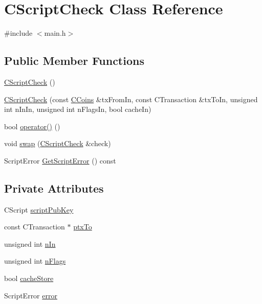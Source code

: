 \hypertarget{class_c_script_check}{}\section{C\+Script\+Check Class Reference}
\label{class_c_script_check}


{\ttfamily \#include $<$main.\+h$>$}

\subsection*{Public Member Functions}
\begin{DoxyCompactItemize}
\item 
\mbox{\hyperlink{class_c_script_check_a4a3bf9c971437bcb6fae3e3254a8c178}{C\+Script\+Check}} ()
\item 
\mbox{\hyperlink{class_c_script_check_a2617b99b66cd1de327478b74d8441c76}{C\+Script\+Check}} (const \mbox{\hyperlink{class_c_coins}{C\+Coins}} \&tx\+From\+In, const C\+Transaction \&tx\+To\+In, unsigned int n\+In\+In, unsigned int n\+Flags\+In, bool cache\+In)
\item 
bool \mbox{\hyperlink{class_c_script_check_a108d4c713338308be3867ed4e65b80c5}{operator()}} ()
\item 
void \mbox{\hyperlink{class_c_script_check_a69fbde608ff29c1885b8b9caf0fd40a0}{swap}} (\mbox{\hyperlink{class_c_script_check}{C\+Script\+Check}} \&check)
\item 
Script\+Error \mbox{\hyperlink{class_c_script_check_a1340496c37e521c253606b5957173afd}{Get\+Script\+Error}} () const
\end{DoxyCompactItemize}
\subsection*{Private Attributes}
\begin{DoxyCompactItemize}
\item 
C\+Script \mbox{\hyperlink{class_c_script_check_a1042feefe3b4706d236edea898e40954}{script\+Pub\+Key}}
\item 
const C\+Transaction $\ast$ \mbox{\hyperlink{class_c_script_check_ac22505a5889791918c2271fd2692e32a}{ptx\+To}}
\item 
unsigned int \mbox{\hyperlink{class_c_script_check_ad7ff03fbbba182a994685ea8c3a2287f}{n\+In}}
\item 
unsigned int \mbox{\hyperlink{class_c_script_check_a9ce4a4cbe2703769d8ec9541c83e0b5e}{n\+Flags}}
\item 
bool \mbox{\hyperlink{class_c_script_check_a9026cd87ffd80d3785aa00e9949dcbd4}{cache\+Store}}
\item 
Script\+Error \mbox{\hyperlink{class_c_script_check_a93e4567a5f6b6d5682f8b1b8357fa848}{error}}
\end{DoxyCompactItemize}


